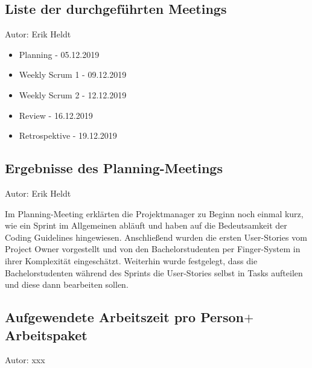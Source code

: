 \subsection{Liste der durchgeführten Meetings}
{\small Autor: Erik Heldt}

\begin{itemize}
	\item Planning - 05.12.2019
	\item Weekly Scrum 1 - 09.12.2019
	\item Weekly Scrum 2 - 12.12.2019
	\item Review - 16.12.2019
	\item Retrospektive - 19.12.2019
\end{itemize}

\subsection{Ergebnisse des Planning-Meetings}
{\small Autor: Erik Heldt}

Im Planning-Meeting erklärten die Projektmanager zu Beginn noch einmal kurz, wie ein Sprint im Allgemeinen abläuft und haben auf die Bedeutsamkeit der Coding Guidelines hingewiesen. Anschließend wurden die ersten User-Stories vom Project Owner vorgestellt und von den Bachelorstudenten per Finger-System in ihrer Komplexität eingeschätzt. Weiterhin wurde festgelegt, dass die Bachelorstudenten während des Sprints die User-Stories selbst in Tasks aufteilen und diese dann bearbeiten sollen.

\subsection{Aufgewendete Arbeitszeit pro Person$+$Arbeitspaket}
{\small Autor: xxx}

